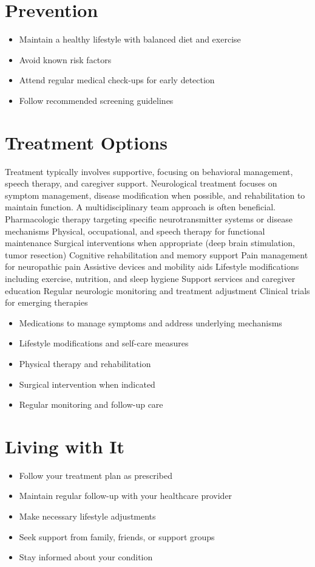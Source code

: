 \section{Prevention}
\begin{itemize}[noitemsep]
  \item Maintain a healthy lifestyle with balanced diet and exercise
  \item Avoid known risk factors
  \item Attend regular medical check-ups for early detection
  \item Follow recommended screening guidelines
\end{itemize}
\section{Treatment Options}
Treatment typically involves supportive, focusing on behavioral management, speech therapy, and caregiver support. Neurological treatment focuses on symptom management, disease modification when possible, and rehabilitation to maintain function. A multidisciplinary team approach is often beneficial. Pharmacologic therapy targeting specific neurotransmitter systems or disease mechanisms Physical, occupational, and speech therapy for functional maintenance Surgical interventions when appropriate (deep brain stimulation, tumor resection) Cognitive rehabilitation and memory support Pain management for neuropathic pain Assistive devices and mobility aids Lifestyle modifications including exercise, nutrition, and sleep hygiene Support services and caregiver education Regular neurologic monitoring and treatment adjustment Clinical trials for emerging therapies

\begin{itemize}[noitemsep]
  \item Medications to manage symptoms and address underlying mechanisms
  \item Lifestyle modifications and self-care measures
  \item Physical therapy and rehabilitation
  \item Surgical intervention when indicated
  \item Regular monitoring and follow-up care
\end{itemize}
\section{Living with It}
\begin{itemize}[noitemsep]
  \item Follow your treatment plan as prescribed
  \item Maintain regular follow-up with your healthcare provider
  \item Make necessary lifestyle adjustments
  \item Seek support from family, friends, or support groups
  \item Stay informed about your condition
\end{itemize}
